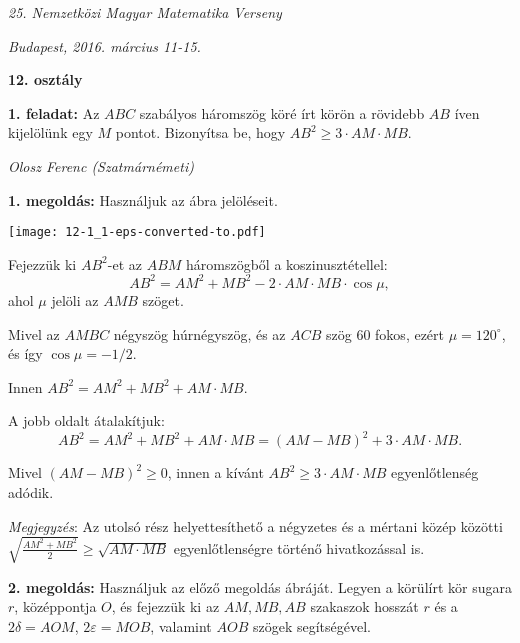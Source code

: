 \documentclass[a4paper,10pt]{article}
\newcommand{\ki}[2]{\hfill {\it #1 (#2)}\medskip}
\begin{document}
\begin{center} \Large {\em 25. Nemzetközi Magyar Matematika Verseny} \end{center}
\begin{center} \large{\em Budapest, 2016. március 11-15.} \end{center}
\smallskip
\begin{center} \large{\bf 12. osztály} \end{center}
\bigskip 

{\bf 1. feladat: } Az $ABC$ szabályos háromszög köré írt körön a rövidebb $AB$ íven
kijelölünk egy $M$ pontot. Bizonyítsa be, hogy $AB^2\ge 3\cdot AM\cdot MB$.

\ki{Olosz Ferenc}{Szatmárnémeti}\medskip

{\bf 1. megoldás: } Használjuk az ábra jelöléseit.

\begin{center}
\texttt{[image: 12-1\_1-eps-converted-to.pdf]}
\end{center}

\noindent Fejezzük ki $AB^2$-et az $ABM$ háromszögből a koszinusztétellel: 
\[AB^2=AM^2+MB^2-2\cdot AM\cdot MB\cdot\cos \mu,\]
ahol $\mu$ jelöli az $AMB$ szöget.

\smallskip

\noindent Mivel az $AMBC$ négyszög húrnégyszög, és az $ACB$ szög
60 fokos, ezért $\mu=120^\circ$, és így $\cos\mu=-1/2$.

\smallskip

\noindent Innen $AB^2=AM^2+MB^2+AM\cdot MB$. 

\smallskip

\noindent A jobb oldalt átalakítjuk: 
\[AB^2=AM^2+MB^2+AM\cdot MB=(AM-MB)^2+3\cdot AM\cdot MB.\]

\noindent Mivel $(AM-MB)^2\ge 0$, innen a kívánt $AB^2\ge 3\cdot AM\cdot MB$ egyenlőtlenség
adódik.

\medskip

\emph{Megjegyzés}: Az utolsó rész helyettesíthető a négyzetes
és a mértani közép közötti  
$\displaystyle \sqrt{\frac{AM^2+MB^2}2}\ge \sqrt{AM\cdot MB}$ 
egyenlőtlenségre történő hivatkozással is.

\medskip

{\bf 2. megoldás: } Használjuk az előző megoldás ábráját. Legyen a körülírt kör sugara $r$, középpontja $O$, és fejezzük ki az $AM, MB,
 AB$ szakaszok hosszát $r$ és a $2\delta=AOM$, $2\varepsilon=MOB$, valamint $AOB$
 szögek segítségével. 

\smallskip
\end{document}

